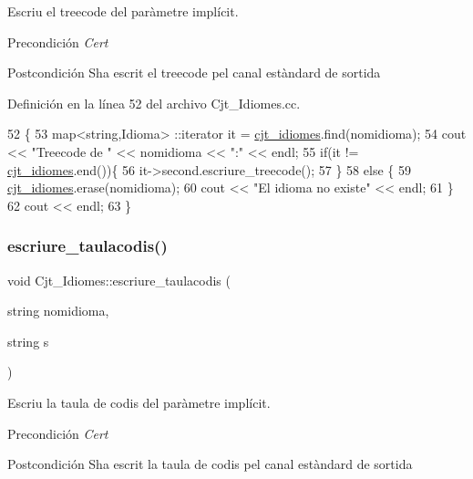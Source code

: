 Escriu el treecode del paràmetre implícit. 

\begin{DoxyPrecond}{Precondición}
{\itshape Cert} 
\end{DoxyPrecond}
\begin{DoxyPostcond}{Postcondición}
S\textquotesingle{}ha escrit el treecode pel canal estàndard de sortida 
\end{DoxyPostcond}


Definición en la línea 52 del archivo Cjt\+\_\+\+Idiomes.\+cc.


\begin{DoxyCode}
52                                                    \{
53     map<string,Idioma> ::iterator it = \hyperlink{class_cjt___idiomes_a1d294e628332477cbb3334cd8fb490a4}{cjt\_idiomes}.find(nomidioma);
54     cout << \textcolor{stringliteral}{"Treecode de "} << nomidioma << \textcolor{stringliteral}{":"} << endl;
55     \textcolor{keywordflow}{if}(it != \hyperlink{class_cjt___idiomes_a1d294e628332477cbb3334cd8fb490a4}{cjt\_idiomes}.end())\{
56         it->second.escriure\_treecode();
57     \}
58     \textcolor{keywordflow}{else} \{
59         \hyperlink{class_cjt___idiomes_a1d294e628332477cbb3334cd8fb490a4}{cjt\_idiomes}.erase(nomidioma);
60         cout << \textcolor{stringliteral}{"El idioma no existe"} << endl;
61     \}
62     cout << endl;
63 \}
\end{DoxyCode}
\mbox{\label{class_cjt___idiomes_afdad5e96949152abf75a9598224be426}} 
\subsubsection{\texorpdfstring{escriure\+\_\+taulacodis()}{escriure\_taulacodis()}}
{\footnotesize\ttfamily void Cjt\+\_\+\+Idiomes\+::escriure\+\_\+taulacodis (\begin{DoxyParamCaption}\item[{string}]{nomidioma,  }\item[{string}]{s }\end{DoxyParamCaption})}



Escriu la taula de codis del paràmetre implícit. 

\begin{DoxyPrecond}{Precondición}
{\itshape Cert} 
\end{DoxyPrecond}
\begin{DoxyPostcond}{Postcondición}
S\textquotesingle{}ha escrit la taula de codis pel canal estàndard de sortida 
\end{DoxyPostcond}


